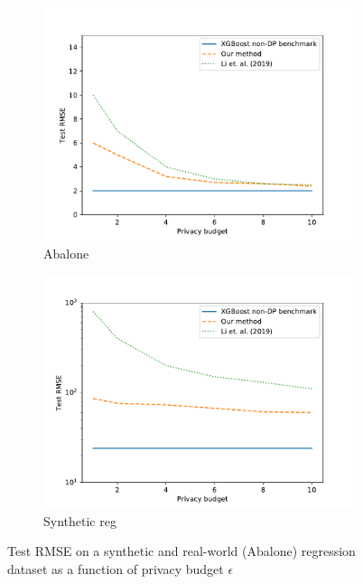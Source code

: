 \documentclass{article}
\theoremstyle{definition}
\begin{document}
\begin{figure}[h]
\begin{subfigure}{.5\textwidth}
  \centering
  \includegraphics[scale=0.5]{figs/plot_abalone_error.pdf}
  \caption{Abalone}
\end{subfigure}
\begin{subfigure}{.5\textwidth}
  \centering
  \includegraphics[scale=0.5]{figs/plot_synthreg_error.pdf}
  \caption{Synthetic reg}
\end{subfigure}
\caption{Test RMSE on a synthetic and real-world (Abalone) regression dataset as a function of 
privacy budget $\epsilon$}
\label{figError} 
\end{figure}
\end{document}
